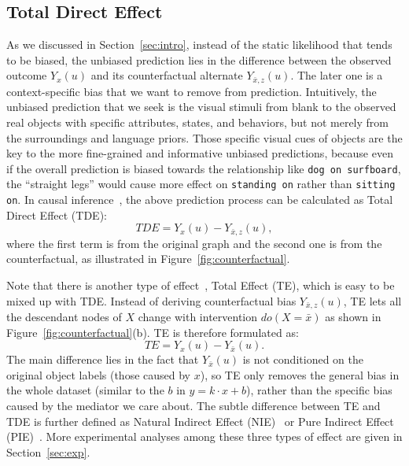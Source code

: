 \documentclass[10pt,twocolumn,letterpaper]{article}
\begin{document}
\vspace{-0.05in}
\subsection{Total Direct Effect}
\vspace{-0.05in}
As we discussed in Section~\ref{sec:intro}, instead of the static likelihood that tends to be biased, the unbiased prediction lies in the difference between the observed outcome $Y_x(u)$ and its counterfactual alternate $Y_{\bar{x},z}(u)$. The later one is a context-specific bias that we want to remove from prediction. Intuitively, the unbiased prediction that we seek is the visual stimuli from blank to the observed real objects with specific attributes, states, and behaviors, but not merely from the surroundings and language priors. Those specific visual cues of objects are the key to the more fine-grained and informative unbiased predictions, because even if the overall prediction is biased towards the relationship like \texttt{dog on surfboard}, the ``straight legs'' would cause more effect on \texttt{standing on} rather than \texttt{sitting on}. In causal inference~\cite{vanderweele2015explanation, vanderweele2013three}, the above prediction process can be calculated as Total Direct Effect (TDE):
\begin{equation}
    TDE = Y_{x}(u) - Y_{\bar{x},z}(u),
    \label{eq:tde}
\end{equation}
where the first term is from the original graph and the second one is from the counterfactual, as illustrated in Figure~\ref{fig:counterfactual}. 

Note that there is another type of effect~\cite{vanderweele2015explanation}, Total Effect (TE), which is easy to be mixed up with TDE. Instead of deriving counterfactual bias $Y_{\bar{x},z}(u)$, TE lets all the descendant nodes of $X$ change with intervention $do(X=\bar{x})$ as shown in Figure~\ref{fig:counterfactual}(b). TE is therefore formulated as:
\begin{equation}
    TE = Y_{x}(u) - Y_{\bar{x}}(u).
    \label{eq:te}
\end{equation}
The main difference lies in the fact that $Y_{\bar{x}}(u)$ is not conditioned on the original object labels (those caused by $x$), so TE only removes the general bias in the whole dataset (similar to the $b$ in $y = k\cdot x +b$), rather than the specific bias caused by the mediator we care about. The subtle difference between TE and TDE is further defined as Natural Indirect Effect (NIE)~\cite{vanderweele2015explanation} or Pure Indirect Effect (PIE)~\cite{vanderweele2013three}. More experimental analyses among these three types of effect are given in Section~\ref{sec:exp}.
\end{document}
